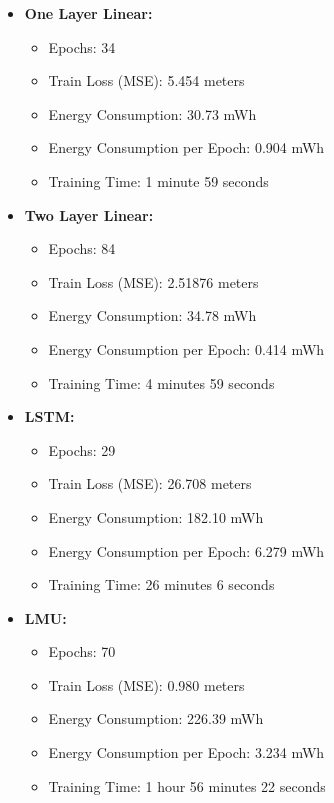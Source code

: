 \begin{itemize}
    \item \textbf{One Layer Linear:} 
    \begin{itemize}
        \item Epochs: 34
        \item Train Loss (MSE): 5.454 meters
        \item Energy Consumption: 30.73 mWh
        \item Energy Consumption per Epoch: 0.904 mWh
        \item Training Time: 1 minute 59 seconds
    \end{itemize}
    
    \item \textbf{Two Layer Linear:} 
    \begin{itemize}
        \item Epochs: 84
        \item Train Loss (MSE): 2.51876 meters
        \item Energy Consumption: 34.78 mWh
        \item Energy Consumption per Epoch: 0.414 mWh
        \item Training Time: 4 minutes 59 seconds
    \end{itemize}
    
    \item \textbf{LSTM:} 
    \begin{itemize}
        \item Epochs: 29
        \item Train Loss (MSE): 26.708 meters
        \item Energy Consumption: 182.10 mWh
        \item Energy Consumption per Epoch: 6.279 mWh
        \item Training Time: 26 minutes 6 seconds
    \end{itemize}
    
    \item \textbf{LMU:} 
    \begin{itemize}
        \item Epochs: 70
        \item Train Loss (MSE): 0.980 meters
        \item Energy Consumption: 226.39 mWh
        \item Energy Consumption per Epoch: 3.234 mWh
        \item Training Time: 1 hour 56 minutes 22 seconds
    \end{itemize}
    

\end{itemize}

